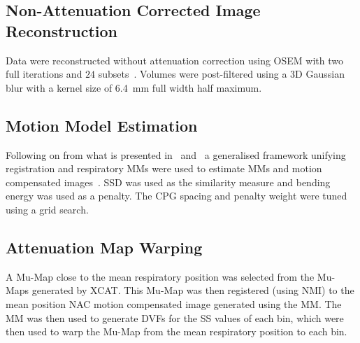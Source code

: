             \subsection{Non-Attenuation Corrected Image Reconstruction} \label{sec:pet_ct_respiratory_motion_correction_with_a_single_attenuation_map_using_nac_derived_deformation_fields_methods_non-attenuation_corrected_image_reconstruction}
                Data were reconstructed without attenuation correction using \gls{OSEM} with two full iterations and $24$ subsets~\parencite{Hudson1994}.
                Volumes were post-filtered using a \gls{3D} Gaussian blur with a kernel size of \SI{6.4}{\milli\metre} full width half maximum.
            
            \subsection{Motion Model Estimation} \label{sec:pet_ct_respiratory_motion_correction_with_a_single_attenuation_map_using_nac_derived_deformation_fields_methods_motion_model_estimation}
                Following on from what is presented in~ and~ a generalised framework unifying registration and respiratory \glspl{MM} were used to estimate \glspl{MM} and motion compensated images~\parencite{McClelland2017}. \gls{SSD} was used as the similarity measure and bending energy was used as a penalty. The \gls{CPG} spacing and penalty weight were tuned using a grid search.
            
            \subsection{Attenuation Map Warping} \label{sec:pet_ct_respiratory_motion_correction_with_a_single_attenuation_map_using_nac_derived_deformation_fields_methods_attenuation_map_warping}
                A \gls{Mu-Map} close to the mean respiratory position was selected from the \glspl{Mu-Map} generated by \gls{XCAT}. This \gls{Mu-Map} was then registered (using \gls{NMI}) to the mean position \gls{NAC} motion compensated image generated using the \gls{MM}. The \gls{MM} was then used to generate \glspl{DVF} for the \gls{SS} values of each bin, which were then used to warp the \gls{Mu-Map} from the mean respiratory position to each bin.
            
